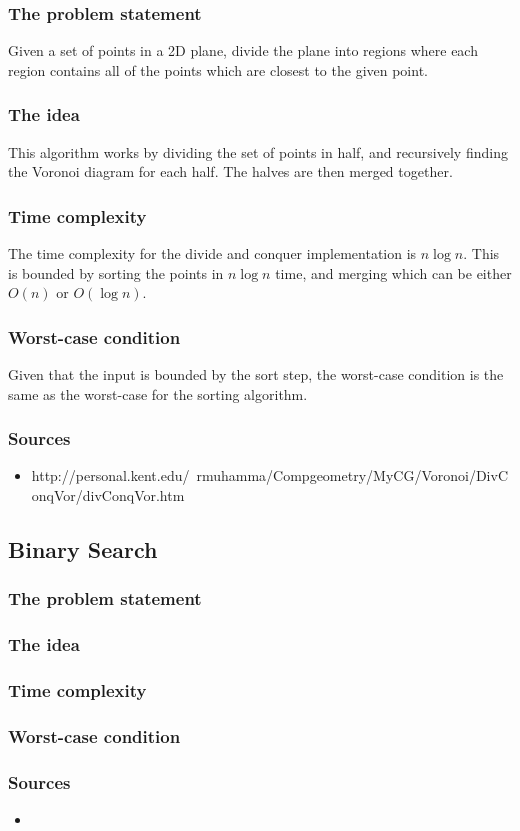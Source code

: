 \documentclass{article}
\begin{document}
\subsubsection{The problem statement}
Given a set of points in a 2D plane, divide the plane into regions where each region contains all of the points which are closest to the given point.
\subsubsection{The idea}
This algorithm works by dividing the set of points in half, and recursively finding the Voronoi diagram for each half.
The halves are then merged together.
\subsubsection{Time complexity}
The time complexity for the divide and conquer implementation is \(n \log n\).
This is bounded by sorting the points in \(n \log n\) time, and merging which can be either \(O(n)\) or \(O(\log n)\).
\subsubsection{Worst-case condition}
Given that the input is bounded by the sort step, the worst-case condition is the same as the worst-case for the sorting algorithm.
\subsubsection{Sources}
\begin{itemize}
    \item http://personal.kent.edu/~rmuhamma/Compgeometry/MyCG/Voronoi/DivConqVor/divConqVor.htm
\end{itemize}
\subsection{Binary Search}
\subsubsection{The problem statement}
\subsubsection{The idea}
\subsubsection{Time complexity}
\subsubsection{Worst-case condition}
\subsubsection{Sources}
\begin{itemize}
    \item 
\end{itemize}
\end{document}
